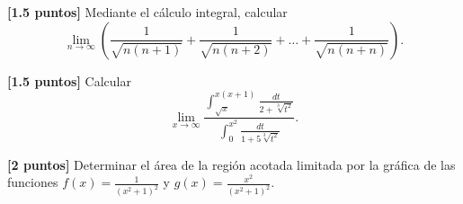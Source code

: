 \documentclass[12pt]{article}
\begin{document}
    \begin{ejercicio}\textbf{[1.5 puntos]}
        Mediante el cálculo integral, calcular
        \begin{equation*}
            \lim_{n\to \infty} \left(\frac{1}{\sqrt{n(n+1)}} +\frac{1}{\sqrt{n(n+2)}} +\dots + \frac{1}{\sqrt{n(n+n)}}\right).
        \end{equation*}
    \end{ejercicio}

    \begin{ejercicio}\textbf{[1.5 puntos]}
        Calcular
        \begin{equation*}
            \lim_{x\to \infty}\frac{ \displaystyle \int_{\sqrt{x}}^{x(x+1)} \frac{dt}{2+\sqrt[3]{t^2}}}{\displaystyle \int_0^{x^2} \frac{dt}{1+5\sqrt[3]{t^2}}}.
        \end{equation*}
    \end{ejercicio}

    \begin{ejercicio}\textbf{[2 puntos]}
        Determinar el área de la región acotada limitada por la gráfica de las funciones $f(x)=\frac{1}{(x^2+1)^2}$ y $g(x)=\frac{x^2}{(x^2+1)^2}$.
    \end{ejercicio}
    
\end{document}
